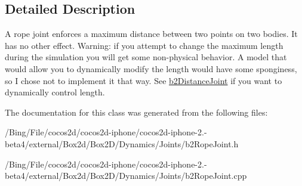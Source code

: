\subsection{Detailed Description}
A rope joint enforces a maximum distance between two points on two bodies. It has no other effect. Warning\-: if you attempt to change the maximum length during the simulation you will get some non-\/physical behavior. A model that would allow you to dynamically modify the length would have some sponginess, so I chose not to implement it that way. See \hyperlink{classb2_distance_joint}{b2\-Distance\-Joint} if you want to dynamically control length. 

The documentation for this class was generated from the following files\-:\begin{DoxyCompactItemize}
\item 
/\-Bing/\-File/cocos2d/cocos2d-\/iphone/cocos2d-\/iphone-\/2.-\/beta4/external/\-Box2d/\-Box2\-D/\-Dynamics/\-Joints/b2\-Rope\-Joint.\-h\item 
/\-Bing/\-File/cocos2d/cocos2d-\/iphone/cocos2d-\/iphone-\/2.-\/beta4/external/\-Box2d/\-Box2\-D/\-Dynamics/\-Joints/b2\-Rope\-Joint.\-cpp\end{DoxyCompactItemize}

